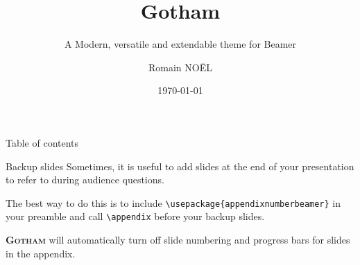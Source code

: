 \documentclass[notheorems, noamsthm, aspectratio=169, 10pt]{beamer}
\title[]{Gotham}
\subtitle{A Modern, versatile and extendable theme for Beamer}
\date[]{\today}
\author[]{Romain NOËL}
\institute{Center for modern beamer themes}
\newcommand{\themename}{\textbf{\textsc{Gotham}}}
\begin{document}
\maketitle

   \begin{frame}[toc]{Table of contents}%
      \tableofcontents%
   \end{frame}

   







\appendix

   \begin{frame}[fragile]{Backup slides}
      Sometimes, it is useful to add slides at the end of your presentation to refer to during audience questions.

      The best way to do this is to include \verb|\usepackage{appendixnumberbeamer}| in your preamble and call \verb|\appendix| before your backup slides.

      \themename{} will automatically turn off slide numbering and progress bars for slides in the appendix.
   \end{frame}
\end{document}
